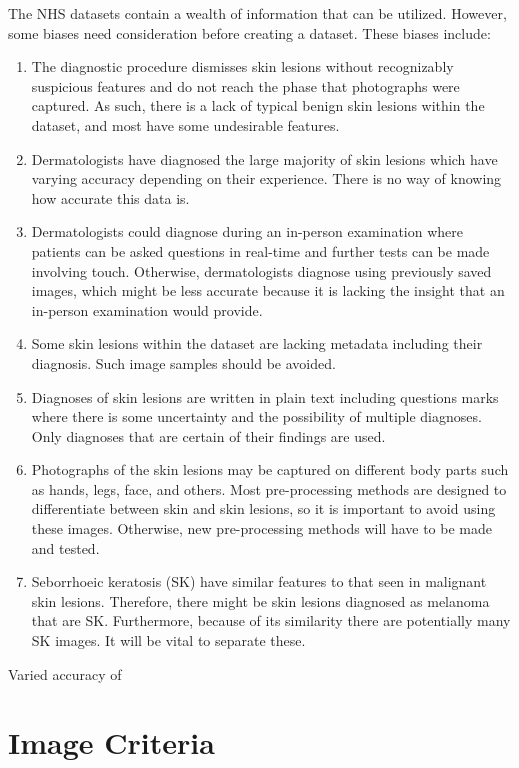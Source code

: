 The NHS datasets contain a wealth of information that can be utilized. However, some biases need consideration before creating a dataset. These biases include:
\begin{enumerate}
    \item  The diagnostic procedure dismisses skin lesions without recognizably suspicious features and do not reach the phase that photographs were captured. As such, there is a lack of typical benign skin lesions within the dataset, and most have some undesirable features.
    \item Dermatologists have diagnosed the large majority of skin lesions which have varying accuracy depending on their experience. There is no way of knowing how accurate this data is.
    \item Dermatologists could diagnose during an in-person examination where patients can be asked questions in real-time and further tests can be made involving touch. Otherwise, dermatologists diagnose using previously saved images, which might be less accurate because it is lacking the insight that an in-person examination would provide.
    \item Some skin lesions within the dataset are lacking metadata including their diagnosis. Such image samples should be avoided.
    \item Diagnoses of skin lesions are written in plain text including questions marks where there is some uncertainty and the possibility of multiple diagnoses. Only diagnoses that are certain of their findings are used.
    \item Photographs of the skin lesions may be captured on different body parts such as hands, legs, face, and others. Most pre-processing methods are designed to differentiate between skin and skin lesions, so it is important to avoid using these images. Otherwise, new pre-processing methods will have to be made and tested.
    \item Seborrhoeic keratosis (SK) have similar features to that seen in malignant skin lesions. Therefore, there might be skin lesions diagnosed as melanoma that are SK. Furthermore, because of its similarity there are potentially many SK images. It will be vital to separate these.
\end{enumerate}

Varied accuracy of

\section{Image Criteria}

